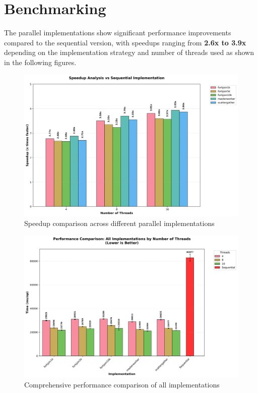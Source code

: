 \chapter{Benchmarking}\label{cap:benchmarking}

The parallel implementations show significant performance improvements compared
to the sequential version, with speedups ranging from \textbf{2.6x to 3.9x}
depending on the implementation strategy and number of threads used as shown in
the following figures.

\begin{figure}[htbp]
   \centering
    \includegraphics[width=\textwidth]{images/speedup_analysis.png}
    \caption{Speedup comparison across different parallel implementations}
    \label{fig:speedup}
\end{figure}

\begin{figure}[htbp]
   \centering
   \includegraphics[width=\textwidth]{images/performance_comparison.png}
   \caption{Comprehensive performance comparison of all implementations}
   \label{fig:performance}
\end{figure}

